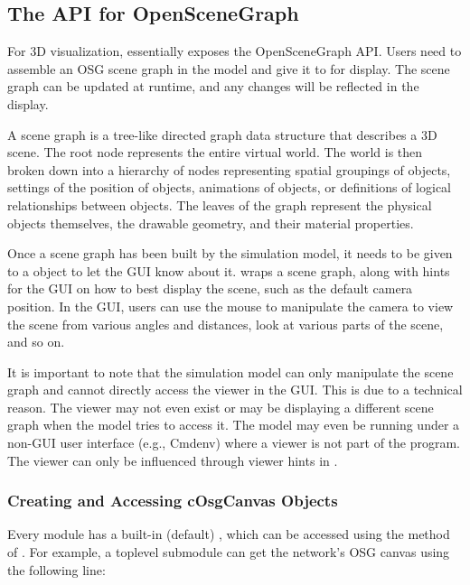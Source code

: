 \subsection{The {\opp} API for OpenSceneGraph}
\label{sec:graphics:opp-api-for-osg}

For 3D visualization, {\opp} essentially exposes the OpenSceneGraph API. Users
need to assemble an OSG scene graph in the model and give it to {\opp} for
display. The scene graph can be updated at runtime, and any changes will be
reflected in the display.

\begin{note}
 A scene graph is a tree-like directed graph data
structure that describes a 3D scene. The root node represents the entire virtual
world. The world is then broken down into a hierarchy of nodes representing
spatial groupings of objects, settings of the position of objects, animations of
objects, or definitions of logical relationships between objects. The leaves of
the graph represent the physical objects themselves, the drawable geometry, and
their material properties.
\end{note}

Once a scene graph has been built by the simulation model, it needs to be given
to a  object to let the {\opp} GUI know about it.
 wraps a scene graph, along with hints for the GUI on how to
best display the scene, such as the default camera position. In the GUI, users
can use the mouse to manipulate the camera to view the scene from various angles
and distances, look at various parts of the scene, and so on.

It is important to note that the simulation model can only manipulate the scene
graph and cannot directly access the viewer in the GUI. This is due to a
technical reason. The viewer may not even exist or may be displaying a different
scene graph when the model tries to access it. The model may even be running
under a non-GUI user interface (e.g., Cmdenv) where a viewer is not part of the
program. The viewer can only be influenced through viewer hints in
.


\subsubsection{Creating and Accessing cOsgCanvas Objects}
\label{sec:graphics:creating-and-accessing-osgcanvas-objects}

Every module has a built-in (default) , which can be accessed
using the  method of . For example, a
toplevel submodule can get the network's OSG canvas using the following line:

